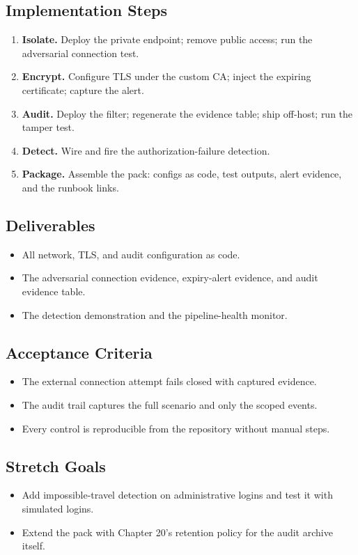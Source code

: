 \subsection*{Implementation Steps}
\begin{enumerate}
    \item \textbf{Isolate.} Deploy the private endpoint; remove public access; run the adversarial connection test.
    \item \textbf{Encrypt.} Configure TLS under the custom CA; inject the expiring certificate; capture the alert.
    \item \textbf{Audit.} Deploy the filter; regenerate the evidence table; ship off-host; run the tamper test.
    \item \textbf{Detect.} Wire and fire the authorization-failure detection.
    \item \textbf{Package.} Assemble the pack: configs as code, test outputs, alert evidence, and the runbook links.
\end{enumerate}

\subsection*{Deliverables}
\begin{itemize}
    \item All network, TLS, and audit configuration as code.
    \item The adversarial connection evidence, expiry-alert evidence, and audit evidence table.
    \item The detection demonstration and the pipeline-health monitor.
\end{itemize}

\subsection*{Acceptance Criteria}
\begin{itemize}
    \item The external connection attempt fails closed with captured evidence.
    \item The audit trail captures the full scenario and only the scoped events.
    \item Every control is reproducible from the repository without manual steps.
\end{itemize}

\subsection*{Stretch Goals}
\begin{itemize}
    \item Add impossible-travel detection on administrative logins and test it with simulated logins.
    \item Extend the pack with Chapter 20's retention policy for the audit archive itself.
\end{itemize}
